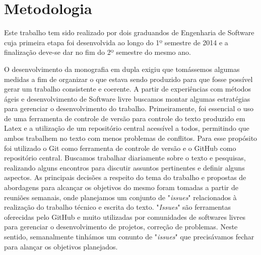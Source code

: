 \section{Metodologia}
\label{sec:methodology}

Este trabalho tem sido realizado por dois graduandos de Engenharia de Software cuja primeira etapa foi desenvolvida ao longo do 1º semestre de 2014 e a finalização deve-se dar no fim do 2º semestre do mesmo ano.
%

O desenvolvimento da monografia em dupla exigiu que tomássemos algumas medidas a fim de organizar o que estava sendo produzido para que fosse possível gerar um trabalho consistente e coerente. A partir de experiências com métodos ágeis e desenvolvimento de Software livre buscamos montar algumas estratégias para gerenciar o desenvolvimento do trabalho. Primeiramente, foi essencial o uso de uma ferramenta de controle de versão para controle do texto produzido em Latex e a utilização de um repositório central acessível a todos, permitindo que ambos trabalhem no texto com menos problemas de conflitos. Para esse propósito foi utilizado o Git como ferramenta de controle de versão e o GitHub como repositório central. Buscamos trabalhar diariamente sobre o texto e pesquisas, realizando alguns encontros para discutir assuntos pertinentes e definir alguns aspectos. As principais decisões a respeito do tema do trabalho e propostas de abordagens para alcançar os objetivos do mesmo foram tomadas a partir de reuniões semanais, onde planejamos um conjunto de "\emph{issues}" relacionados à realização do trabalho técnico e escrita do texto. "\emph{Issues}" são ferramentas oferecidas pelo GitHub e muito utilizadas por comunidades de softwares livres para gerenciar o desenvolvimento de projetos, correção de problemas. Neste sentido, semanalmente tinhámos um conunto de "\emph{issues}" que precisávamos fechar para alançar os objetivos planejados.
